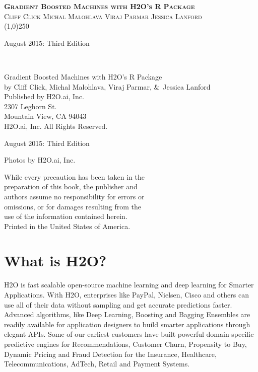 \documentclass{article}[11pt]
\begin{document}
\thispagestyle{empty} %

\begin{center}
\textsc{\Large\bf{Gradient Boosted Machines with H2O's R Package}}
\\
\bigskip
\textsc{\small{Cliff Click \hspace{40pt} Michal Malohlava \hspace{40pt} Viraj Parmar \hspace{40pt} Jessica Lanford}}
\\
\bigskip
\line(1,0){250}  %

\bigskip
August 2015: Third Edition 
\\%
\bigskip
\end{center}

{\raggedright\vfill\ 

Gradient Boosted Machines with H2O's R Package\\
  by Cliff Click, Michal Malohlava, Viraj Parmar, \&\ Jessica Lanford\\
\bigskip
  Published by H2O.ai, Inc. \\
2307 Leghorn St. \\
Mountain View, CA 94043\\
\bigskip
{} H2O.ai, Inc. All Rights Reserved. 
\bigskip

August 2015: Third Edition
\bigskip

Photos by \textcopyright H2O.ai, Inc. 
\bigskip

While every precaution has been taken in the\\
preparation of this book, the publisher and\\
authors assume no responsibility for errors or\\
omissions, or for damages resulting from the\\
use of the information contained herein.\\
\bigskip
Printed in the United States of America. 


}\par

\newpage
\tableofcontents

\newpage
\section{What is H2O?}

H2O is fast scalable open-source machine learning and deep learning for Smarter Applications. With H2O, enterprises like PayPal, Nielsen, Cisco and others can use all of their data without sampling and get accurate predictions faster. Advanced algorithms, like Deep Learning, Boosting and Bagging Ensembles are readily available for application designers to build smarter applications through elegant APIs. Some of our earliest customers have built powerful domain-specific predictive engines for Recommendations, Customer Churn, Propensity to Buy, Dynamic Pricing and Fraud Detection for the Insurance, Healthcare, Telecommunications, AdTech,
Retail and Payment Systems.
\end{document}
